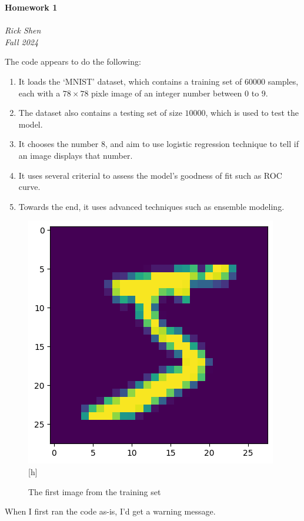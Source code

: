 \documentclass[11pt]{article}
\author{Rick Shen}
\begin{document}
\begin{center}
    \vspace*{\fill}
        \Large\textbf{Homework 1}\\
        \Large{}\\    
        \large\textit{Rick Shen}\\
        \large\textit{Fall 2024}
    \vspace*{\fill}
\end{center}

The code appears to do the following:
\begin{enumerate}
    \item It loads the `MNIST' dataset, which contains a training set of $60000$ samples, each with a $78 \times 78$ pixle image of an integer number between $0$ to $9$.
    \item The dataset also contains a testing set of size $10000$, which is used to test the model. 
    \item It chooses the number $8$, and aim to use logistic regression technique to tell if an image displays that number. 
    \item It uses several criterial to assess the model's goodness of fit such as ROC curve.
    \item Towards the end, it uses advanced techniques such as ensemble modeling. 
\end{enumerate}
\begin{figure}
\includegraphics{output.png}[h]
\caption{The first image from the training set}
\end{figure}
When I first ran the code as-is, I'd get a warning message. 
\end{document}
